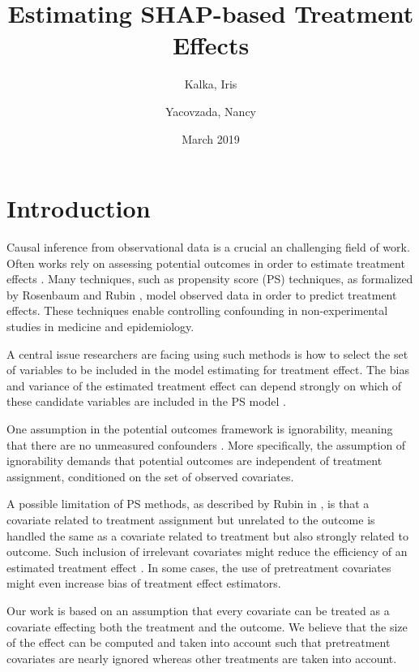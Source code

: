 \documentclass{article}
\title{Estimating SHAP-based Treatment Effects}
\author{Kalka, Iris
        \and
        Yacovzada, Nancy}
\date{March 2019}
\begin{document}
\maketitle

\section{Introduction}
Causal inference from observational data is a crucial an challenging field of work. Often works rely on assessing potential outcomes in order to estimate treatment effects \cite{rubin1974estimating}. Many techniques, such as propensity score (PS) techniques, as formalized by Rosenbaum and Rubin \cite{rosenbaum1983central}, model observed data in order to predict treatment effects. These techniques enable controlling confounding in non-experimental studies in medicine and epidemiology. 


A central issue researchers are facing using such methods is how to select the set of variables to be included in the model estimating for treatment effect. The bias and variance of the estimated treatment effect can depend strongly on which of these candidate variables are included in the PS model \cite{brookhart2006variable}.

One assumption in the potential outcomes framework is ignorability, meaning that there are no unmeasured confounders \cite{rosenbaum1983central}. More specifically, the assumption of ignorability demands that potential outcomes are independent of treatment assignment, conditioned on the set of observed covariates.

A possible limitation of PS methods, as described by Rubin in \cite{rubin1997estimating}, is that a covariate related to treatment assignment but unrelated to the outcome is handled the same as a covariate related to treatment but also strongly related to outcome. Such inclusion of irrelevant covariates might reduce the efficiency of an estimated treatment effect \cite{10.1093/biomet/asx009}. In some cases, the use of pretreatment covariates might even increase bias of treatment effect estimators.

Our work is based on an assumption that every covariate can be treated as a covariate effecting both the treatment and the outcome. 
We believe that the size of the effect can be computed and taken into account such that pretreatment covariates are nearly ignored whereas other treatments are taken into account. 
\end{document}

